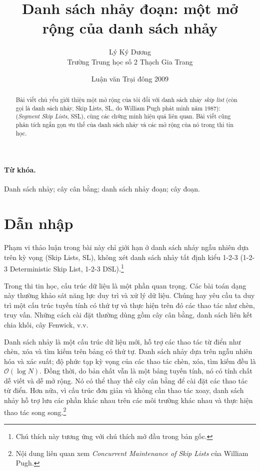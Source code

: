 \documentclass[11pt]{article}
\title{Danh sách nhảy đoạn: một mở rộng của danh sách nhảy}
\author{Lý Ký Dương\\Trường Trung học số 2 Thạch Gia Trang}
\date{Luận văn Trại đông 2009}
\newcommand{\Oh}{\mathcal{O}}
\begin{document}
\maketitle


\begin{abstract}
Bài viết chủ yếu giới thiệu một mở rộng của tôi đối với danh sách nhảy
\textit{skip list} (còn gọi là danh sách nhảy, Skip Lists, SL, do William
Pugh phát minh năm 1987):  (\textit{Segment Skip
Lists}, SSL), cùng các chứng minh hiệu quả liên quan. Bài viết cũng phân tích
ngắn gọn ưu thế của danh sách nhảy và các mở rộng của nó trong thi tin học.
\end{abstract}

\paragraph{Từ khóa.}
Danh sách nhảy; cây cân bằng; danh sách nhảy đoạn; cây đoạn.

\section*{Dẫn nhập}

Phạm vi thảo luận trong bài này chỉ giới hạn ở danh sách nhảy ngẫu nhiên dựa
trên kỳ vọng (Skip Lists, SL), không xét danh sách nhảy tất định kiểu 1-2-3
(1-2-3 Deterministic Skip List, 1-2-3 DSL).\footnote{Chú thích này tương ứng
với chú thích mở đầu trong bản gốc.}

Trong thi tin học, cấu trúc dữ liệu là một phần quan trọng. Các bài toán dạng
này thường khảo sát năng lực duy trì và xử lý dữ liệu. Chúng hay yêu cầu ta
duy trì một cấu trúc tuyến tính có thứ tự và thực hiện trên đó các thao tác
như chèn, truy vấn. Những cách cài đặt thường dùng gồm cây cân bằng, danh sách
liên kết chia khối, cây Fenwick, v.v.

Danh sách nhảy là một cấu trúc dữ liệu mới, hỗ trợ các thao tác từ điển như
chèn, xóa và tìm kiếm trên bảng có thứ tự. Danh sách nhảy dựa trên ngẫu nhiên
hóa và xác suất; độ phức tạp kỳ vọng của các thao tác chèn, xóa, tìm kiếm đều
là $\Oh(\log N)$. Đồng thời, do bản chất vẫn là một bảng tuyến tính, nó có
tính chất dễ viết và dễ mở rộng. Nó có thể thay thế cây cân bằng để cài đặt
các thao tác từ điển. Hơn nữa, vì cấu trúc đơn giản và không cần thao tác
xoay, danh sách nhảy hỗ trợ lưu các phần khác nhau trên các môi trường khác
nhau và thực hiện thao tác song song.\footnote{Nội dung liên quan xem
\textit{Concurrent Maintenance of Skip Lists} của William Pugh.}
\end{document}
